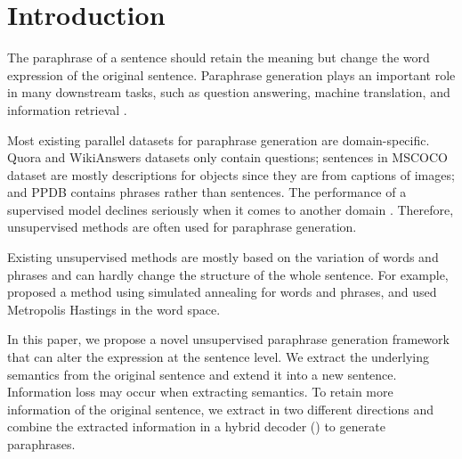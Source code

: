 \section{Introduction}
The paraphrase of a sentence should retain the meaning but change the word expression of the original sentence. Paraphrase generation plays an important role in many downstream tasks, such as question answering, machine translation, and information retrieval \citep{hu2019improved}. 

Most existing parallel datasets for paraphrase generation are 
domain-specific. Quora and WikiAnswers \citep{fader2013paraphrase} datasets 
only contain questions; sentences in MSCOCO \citep{lin2014microsoft} dataset 
are mostly descriptions for objects since they are from captions of images; 
and PPDB \citep{ganitkevitch2013ppdb} contains phrases rather than sentences. 
The performance of a supervised model declines seriously when it comes to 
another domain \citep{li2019decomposable}. 
Therefore, unsupervised methods 
are often used for paraphrase generation. 

% 

Existing unsupervised methods are mostly based on the variation of 
words and phrases and can hardly change the structure of the whole sentence. 
For example, \citet{liu2019unsupervised} proposed a method using simulated 
annealing for words and phrases, and \citet{miao2019cgmh} used Metropolis Hastings in the word space. 

In this paper, we propose a novel unsupervised paraphrase generation 
framework that can alter the expression at the sentence level. 
We extract the underlying semantics from the original sentence and 
extend it into a new sentence. Information loss may occur when 
extracting semantics. To retain more information of the original sentence, 
we extract in two different directions and combine the extracted 
information in a hybrid decoder 
() to generate paraphrases.

